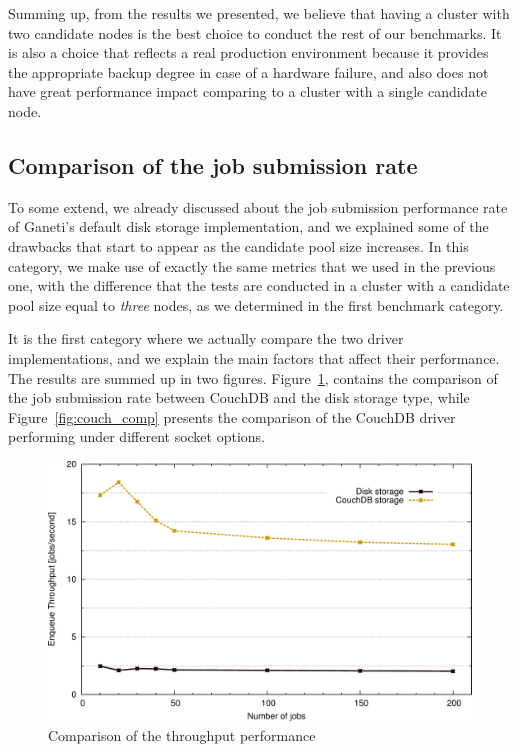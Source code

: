 Summing up, from the results we presented, we believe that having a cluster with
two candidate nodes is the best choice to conduct the rest of our benchmarks. It
is also a choice that reflects a real production environment because it provides
the appropriate backup degree in case of a hardware failure, and also does not
have great performance impact comparing to a cluster with a single candidate
node.

\subsection{Comparison of the job submission rate}\label{subsec:enqueue_rate}

To some extend, we already discussed about the job submission performance rate
of Ganeti's default disk storage implementation, and we explained some of the
drawbacks that start to appear as the candidate pool size increases. In this
category, we make use of exactly the same metrics that we used in the previous
one, with the difference that the tests are conducted in a cluster with a
candidate pool size equal to \emph{three} nodes, as we determined in the first
benchmark category.

It is the first category where we actually compare the two driver
implementations, and we explain the main factors that affect their performance.
The results are summed up in two figures. Figure~\ref{fig:comp}, contains the
comparison of the job submission rate between CouchDB and the disk storage type,
while Figure~\ref{fig:couch_comp} presents the comparison of the CouchDB driver
performing under different socket options.

\begin{figure}[htbp]
  \begin{center}
    \includegraphics[width=1.0\maxwidth]{../figures/comp.pdf}
    \caption{Comparison of the throughput performance}
    \label{fig:comp}
  \end{center}
\end{figure}

